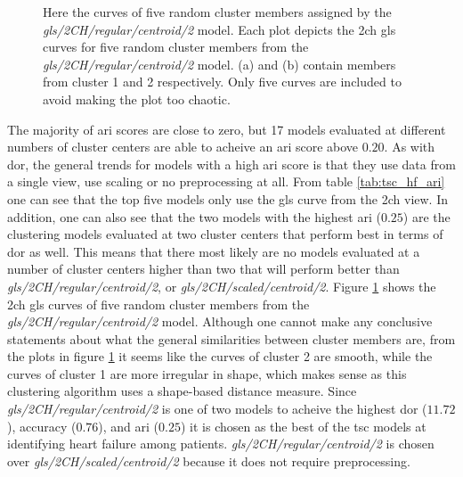\begin{figure}[htb]
    \centering
    
    \caption{Here the curves of five random cluster members assigned by the \textit{gls/2CH/regular/centroid/2} model. Each plot depicts the \acrshort{2ch} \acrshort{gls} curves for five random cluster members from the \textit{gls/2CH/regular/centroid/2} model. (a) and (b) contain members from cluster 1 and 2 respectively. Only five curves are included to avoid making the plot too chaotic.}
    \label{fig:tsc_hf_best_meth_5_samples}
\end{figure}

\newpage

The majority of \acrshort{ari} scores are close to zero, but 17 models evaluated at different numbers of cluster centers are able to acheive an \acrshort{ari} score above $0.20$. As with \acrshort{dor}, the general trends for models with a high \acrshort{ari} score is that they use data from a single view, use scaling or no preprocessing at all. From table \ref{tab:tsc_hf_ari} one can see that the top five models only use the \acrshort{gls} curve from the \acrshort{2ch} view. In addition, one can also see that the two models with the highest \acrshort{ari} ($0.25$) are the clustering models evaluated at two cluster centers that perform best in terms of \acrshort{dor} as well. This means that there most likely are no models evaluated at a number of cluster centers higher than two that will perform better than \textit{gls/2CH/regular/centroid/2}, or \textit{gls/2CH/scaled/centroid/2}. Figure \ref{fig:tsc_hf_best_meth_5_samples} shows the \acrshort{2ch} \acrshort{gls} curves of five random cluster members from the \textit{gls/2CH/regular/centroid/2} model. Although one cannot make any conclusive statements about what the general similarities between cluster members are, from the plots in figure \ref{fig:tsc_hf_best_meth_5_samples} it seems like the curves of cluster 2 are smooth, while the curves of cluster 1 are more irregular in shape, which makes sense as this clustering algorithm uses a shape-based distance measure. Since \textit{gls/2CH/regular/centroid/2} is one of two models to acheive the highest \acrshort{dor} ($11.72$), accuracy ($0.76$), and \acrshort{ari} ($0.25$) it is chosen as the best of the \acrshort{tsc} models at identifying heart failure among patients. \textit{gls/2CH/regular/centroid/2} is chosen over \textit{gls/2CH/scaled/centroid/2} because it does not require preprocessing.
\bigskip

